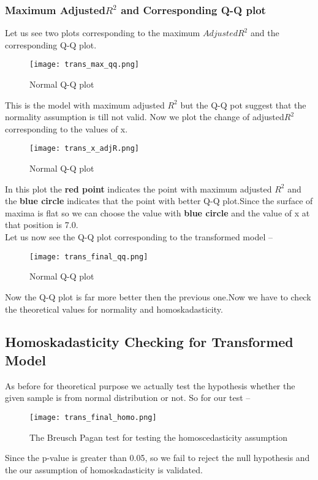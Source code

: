 \documentclass[A4paper,11pt]{report}
\begin{document}
	 \subsubsection{Maximum Adjusted$R^2$ and Corresponding Q-Q plot}
	 Let us see two plots corresponding to the maximum $Adjusted R^2$ and the corresponding Q-Q plot.
 	\begin{figure}[H]
 		\texttt{[image: trans\_max\_qq.png]}
 		\caption{Normal Q-Q plot}
 	\end{figure}
	This is the model with maximum adjusted $R^2$ but the Q-Q pot suggest that the normality assumption is till not valid.
	Now we plot the change of adjusted$R^2$ corresponding to the values of x.
	\begin{figure}[H]
		\texttt{[image: trans\_x\_adjR.png]}
		\caption{Normal Q-Q plot}
	\end{figure} 
	In this plot the \textbf{red point} indicates the point with maximum adjusted $R^2$ and the \textbf{blue circle} indicates that the point with better Q-Q plot.Since the surface of maxima is flat so we can choose the value with \textbf{blue circle} and the value of x at that position is 7.0.\\
	Let us now see the Q-Q plot corresponding to the transformed model --
	\begin{figure}[H]
		\texttt{[image: trans\_final\_qq.png]}
		\caption{Normal Q-Q plot}
	\end{figure} 
	 Now the Q-Q plot is far more better then the previous one.Now we have to check the theoretical values for normality and homoskadasticity.
	 \subsection{Homoskadasticity Checking for Transformed Model}
	 As before for theoretical purpose we actually test the hypothesis whether the given sample is from normal distribution or not. So for our test --
	 \begin{figure}[H]
	 	\texttt{[image: trans\_final\_homo.png]}
	 	\caption{The Breusch Pagan test for testing the homoscedasticity assumption}
	 \end{figure} 
	 Since the p-value is greater than 0.05, so we fail to reject the null hypothesis and the our assumption of homoskadasticity is validated.
\end{document}
